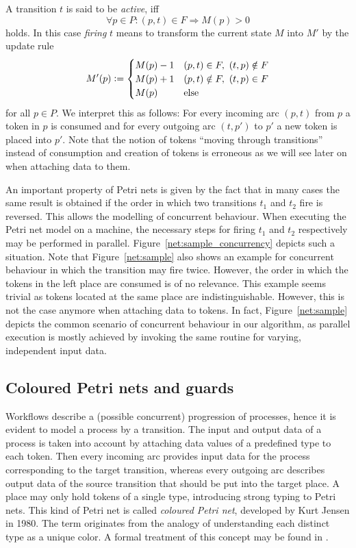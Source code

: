A transition $t$ is said to be \emph{active}, iff
$$\forall p\in P\colon (p,t)\in F\Rightarrow M(p) > 0$$
holds. In this case \emph{firing} $t$ means to transform the current state $M$ into $M'$ by the update rule
$$M'(p) \mathrel{\mathop:}= \begin{cases}
M(p) - 1 & (p,t)\in F,\ (t,p)\notin F \\
M(p) + 1 & (p,t)\notin F,\ (t,p)\in F \\
M(p) & \text{else}
\end{cases}$$
for all $p\in P$. We interpret this as follows: For every incoming arc $(p,t)$ from $p$ a token in $p$ is consumed and for every outgoing arc $(t, p')$ to $p'$ a new token is placed into $p'$. Note that the notion of tokens ``moving through transitions'' instead of consumption and creation of tokens is erroneous as we will see later on when attaching data to them.



An important property of Petri nets is given by the fact that in many cases the same result is obtained if the order in which two transitions $t_1$ and $t_2$ fire is reversed. This allows the modelling of concurrent behaviour. When executing the Petri net model on a machine, the necessary steps for firing $t_1$ and $t_2$ respectively may be performed in parallel. Figure~\ref{net:sample_concurrency} depicts such a situation. Note that Figure~\ref{net:sample} also shows an example for concurrent behaviour in which the transition may fire twice. However, the order in which the tokens in the left place are consumed is of no relevance. This example seems trivial as tokens located at the same place are indistinguishable. However, this is not the case anymore when attaching data to tokens. In fact, Figure~\ref{net:sample} depicts the common scenario of concurrent behaviour in our algorithm, as parallel execution is mostly achieved by invoking the same routine for varying, independent input data.

\subsection*{Coloured Petri nets and guards}

Workflows describe a (possible concurrent) progression of processes, hence it is evident to model a process by a transition. The input and output data of a process is taken into account by attaching data values of a predefined type to each token. Then every incoming arc provides input data for the process corresponding to the target transition, whereas every outgoing arc describes output data of the source transition that should be put into the target place. A place may only hold tokens of a single type, introducing strong typing to Petri nets. This kind of Petri net is called \emph{coloured Petri net}, developed by Kurt Jensen in 1980. The term originates from the analogy of understanding each distinct type as a unique color. A formal treatment of this concept may be found in \cite{cp_nets}.

